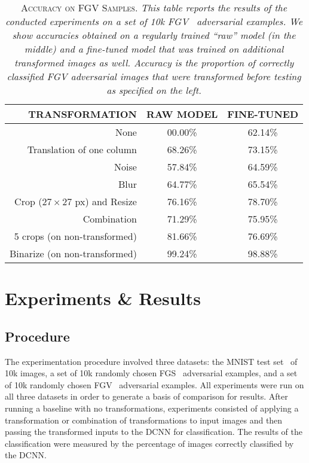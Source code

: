 \documentclass[conference]{IEEEtran}
\renewcommand\cap[3]{\caption[#2]{\label{#1}\textsc{#2}. \small\textit{#3}}}
\begin{document}
\begin{table}[t]
\footnotesize
\centering\vspace*{1.55ex}
\begin{tabular}{r|c|c}
\toprule
TRANSFORMATION              				& RAW MODEL	& FINE-TUNED\\ \midrule \midrule
None                        				& 00.00\%    & 62.14\%\\
Translation of one column   				& 68.26\%	& 73.15\%\\
Noise                       				& 57.84\%  	& 64.59\%\\
Blur                        				& 64.77\% 	& 65.54\%\\ 
Crop (27\,$\times$\,27 px) and Resize 	& 76.16\%  	& 78.70\%\\
Combination								& 71.29\%  	& 75.95\%\\ \midrule 
5 crops (on non-transformed)   			& 81.66\%  	& 76.69\%\\
Binarize (on non-transformed)   			& 99.24\%  	& 98.88\%\\
\bottomrule
\end{tabular}%
\cap{table:fgv}{Accuracy on FGV Samples}{This table reports the results of the conducted experiments on a set of 10k FGV~\cite{c1} adversarial examples. We show accuracies obtained on a regularly trained ``raw'' model (in the middle) and a fine-tuned model that was trained on additional transformed images as well. Accuracy is the proportion of correctly classified FGV adversarial images that were transformed before testing as specified on the left.}
\end{table}



\section{Experiments \& Results}
\subsection{Procedure}
The experimentation procedure involved three datasets:  the MNIST test set~\cite{c9} of 10k images, a set of 10k randomly chosen FGS~\cite{c5} adversarial examples, and a set of 10k randomly chosen FGV~\cite{c1} adversarial examples.  All experiments were run on all three datasets in order to generate a basis of comparison for results.  After running a baseline with no transformations, experiments consisted of applying a transformation or combination of transformations to input images and then passing the transformed inputs to the DCNN for classification.  The results of the classification were measured by the percentage of images correctly classified by the DCNN.
\end{document}
